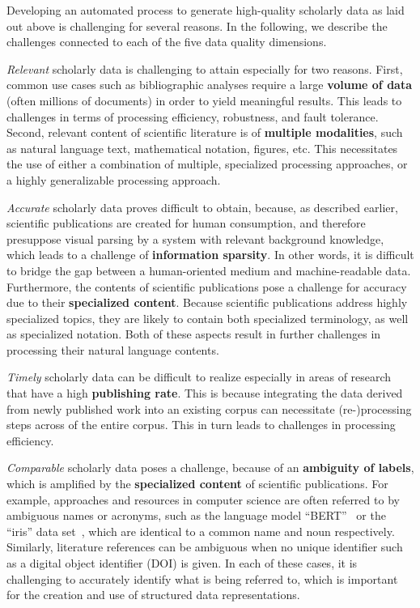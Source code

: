 
Developing an automated process to generate high-quality scholarly data as laid out above is challenging for several reasons. In the following, we describe the challenges connected to each of the five data quality dimensions.

\textit{Relevant} scholarly data is challenging to attain especially for two reasons. First, common use cases such as bibliographic analyses require a large \textbf{volume of data} (often millions of documents) in order to yield meaningful results. This leads to challenges in terms of processing efficiency, robustness, and fault tolerance. Second, relevant content of scientific literature is of \textbf{multiple modalities}, such as natural language text, mathematical notation, figures, etc. This necessitates the use of either a combination of multiple, specialized processing approaches, or a highly generalizable processing approach.

\textit{Accurate} scholarly data proves difficult to obtain, because, as described earlier, scientific publications are created for human consumption, and therefore presuppose visual parsing by a system with relevant background knowledge, which leads to a challenge of \textbf{information sparsity}. In other words, it is difficult to bridge the gap between a human-oriented medium and machine-readable data. Furthermore, the contents of scientific publications pose a challenge for accuracy due to their \textbf{specialized content}. Because scientific publications address highly specialized topics, they are likely to contain both specialized terminology, as well as specialized notation. Both of these aspects result in further challenges in processing their natural language contents.

\textit{Timely} scholarly data can be difficult to realize especially in areas of research that have a high \textbf{publishing rate}. This is because integrating the data derived from newly published work into an existing corpus can necessitate (re-)processing steps across of the entire corpus. This in turn leads to challenges in processing efficiency.

\textit{Comparable} scholarly data poses a challenge, because of an \textbf{ambiguity of labels}, which is amplified by the \textbf{specialized content} of scientific publications. For example, approaches and resources in computer science are often referred to by ambiguous names or acronyms, such as the language model ``BERT''~\cite{devlin2019} or the ``iris'' data set~\cite{Fisher1936}, which are identical to a common name and noun respectively. Similarly, literature references can be ambiguous when no unique identifier such as a digital object identifier (DOI) is given. In each of these cases, it is challenging to accurately identify what is being referred to, which is important for the creation and use of structured data representations.

